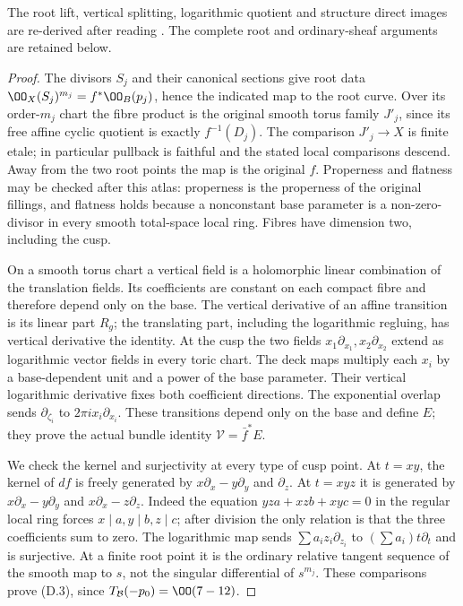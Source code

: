 The root lift, vertical splitting, logarithmic quotient and
structure direct images are re-derived after reading
\citet[Lemmas~6.2 and 6.7; Propositions~6.6 and 6.10]{DuEtAl2026v1}.
The complete root and ordinary-sheaf arguments are retained below.

\begin{proof}
The divisors $S_j$ and their canonical sections give root data
$\OO_X(S_j)^{m_j}=f^*\OO_B(p_j)$, hence the indicated map to the root
curve. Over its order-$m_j$ chart the fibre product is the original
smooth torus family $J'_j$, since its free affine cyclic quotient is
exactly $f^{-1}(D_j)$. The comparison $J'_j\to X$ is finite etale;
in particular pullback is faithful and the stated local comparisons
descend. Away from the two root points the map is the original $f$.
Properness and flatness may be checked after this atlas: properness is
the properness of the original fillings, and flatness holds because a
nonconstant base parameter is a non-zero-divisor in every smooth
total-space local ring. Fibres have dimension two, including the cusp.

On a smooth torus chart a vertical field is a holomorphic linear
combination of the translation fields. Its coefficients are constant
on each compact fibre and therefore depend only on the base. The
vertical derivative of an affine transition is its linear part $R_g$;
the translating part, including the logarithmic regluing, has vertical
derivative the identity. At the cusp the two fields
$x_1\partial_{x_1},x_2\partial_{x_2}$ extend as logarithmic vector
fields in every toric chart. The deck maps multiply each $x_i$ by a
base-dependent unit and a power of the base parameter. Their vertical
logarithmic derivative fixes both coefficient directions. The
exponential overlap sends $\partial_{\zeta_i}$ to
$2\pi i x_i\partial_{x_i}$. These transitions depend only on the base
and define $E$; they prove the actual bundle identity
$\mathcal V=\bar f^*E$.

We check the kernel and surjectivity at every type of cusp point. At
$t=xy$, the kernel of $df$ is freely generated by
$x\partial_x-y\partial_y$ and $\partial_z$. At $t=xyz$ it is generated
by $x\partial_x-y\partial_y$ and $x\partial_x-z\partial_z$.
Indeed the equation $yz a+xz b+xy c=0$ in the regular local ring forces
$x\mid a,y\mid b,z\mid c$; after division the only relation is that
the three coefficients sum to zero. The logarithmic map sends
$\sum a_i z_i\partial_{z_i}$ to $(\sum a_i)t\partial_t$ and is
surjective. At a finite root point it is the ordinary relative tangent
sequence of the smooth map to $s$, not the singular differential of
$s^{m_j}$. These comparisons prove (D.3), since
$T_{\mathcal B}(-p_0)=\OO(7-12)$.


\end{proof}
